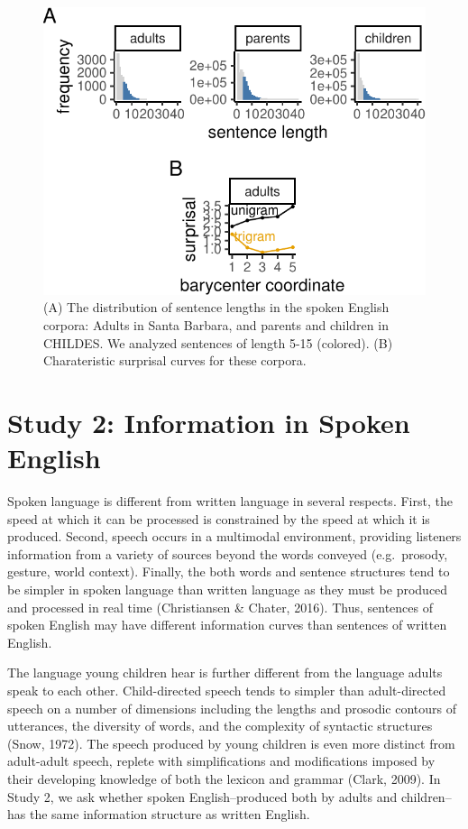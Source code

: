 \documentclass[man,floatsintext]{apa6}
\begin{document}
\begin{figure}[tb]

{\centering \includegraphics{figs/spoken-figs-1} 

}

\caption{(A) The distribution of sentence lengths in the spoken English corpora: Adults in Santa Barbara, and parents and children in CHILDES. We analyzed sentences of length 5-15 (colored). (B) Charateristic surprisal curves for these corpora.}\label{fig:spoken-figs}
\end{figure}

\hypertarget{study-2-information-in-spoken-english}{%
\section{Study 2: Information in Spoken English}\label{study-2-information-in-spoken-english}}

Spoken language is different from written language in several respects. First, the speed at which it can be processed is constrained by the speed at which it is produced. Second, speech occurs in a multimodal environment, providing listeners information from a variety of sources beyond the words conveyed (e.g.~prosody, gesture, world context). Finally, the both words and sentence structures tend to be simpler in spoken language than written language as they must be produced and processed in real time (Christiansen \& Chater, 2016). Thus, sentences of spoken English may have different information curves than sentences of written English.

The language young children hear is further different from the language adults speak to each other. Child-directed speech tends to simpler than adult-directed speech on a number of dimensions including the lengths and prosodic contours of utterances, the diversity of words, and the complexity of syntactic structures (Snow, 1972). The speech produced by young children is even more distinct from adult-adult speech, replete with simplifications and modifications imposed by their developing knowledge of both the lexicon and grammar (Clark, 2009). In Study 2, we ask whether spoken English--produced both by adults and children-- has the same information structure as written English.
\end{document}
